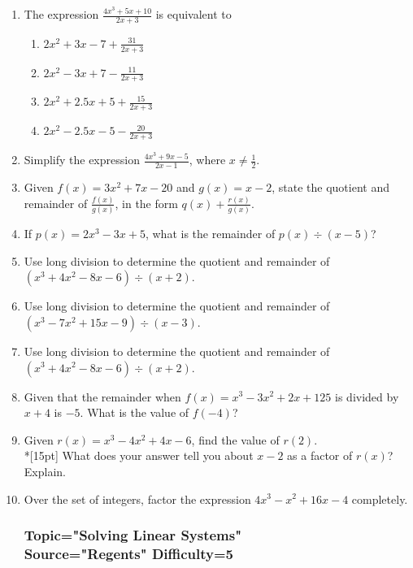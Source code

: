 \documentclass[12pt, oneside]{article}
\begin{document}
\begin{enumerate}
\item The expression $\displaystyle \frac{4x^3+5x+10}{2x+3}$ is equivalent to \begin{enumerate}
    \item $\displaystyle 2x^2+3x-7+\frac{31}{2x+3}$
    \item $\displaystyle 2x^2-3x+7-\frac{11}{2x+3}$
    \item $\displaystyle 2x^2+2.5x+5+\frac{15}{2x+3}$
    \item $\displaystyle 2x^2-2.5x-5-\frac{20}{2x+3}$
\end{enumerate} %

\item Simplify the expression $\displaystyle \frac{4x^3+9x-5}{2x-1}$, where $x \neq \frac{1}{2}$. %

\item Given $f(x)=3x^2+7x-20$ and $g(x)=x-2$, state the quotient and remainder of $\displaystyle \frac{f(x)}{g(x)}$, in the form $\displaystyle q(x)+ \frac{r(x)}{g(x)}$. %

\item If $p(x)=2x^3-3x+5$, what is the remainder of $p(x) \div (x-5)$? %

\item Use long division to determine the quotient and remainder of $(x^3+4x^2-8x-6) \div (x+2)$.
\item Use long division to determine the quotient and remainder of $(x^3-7x^2+15x-9) \div (x-3)$.
\item Use long division to determine the quotient and remainder of $(x^3+4x^2-8x-6) \div (x+2)$.

\item Given that the remainder when  $f(x)=x^3-3x^2+2x+125$ is divided by $x+4$ is $-5$. What is the value of $f(-4)$?

\item Given $r(x)=x^3-4x^2+4x-6$, find the value of $r(2)$.\\*[15pt]
What does your answer tell you about $x-2$ as a factor of $r(x)$? Explain. %

\item Over the set of integers, factor the expression $4x^3-x^2  +16x-4$ completely.
 
\subsubsection*{Topic="Solving Linear Systems"\\
Source="Regents" 
Difficulty=5}


\end{enumerate}
\end{document}
